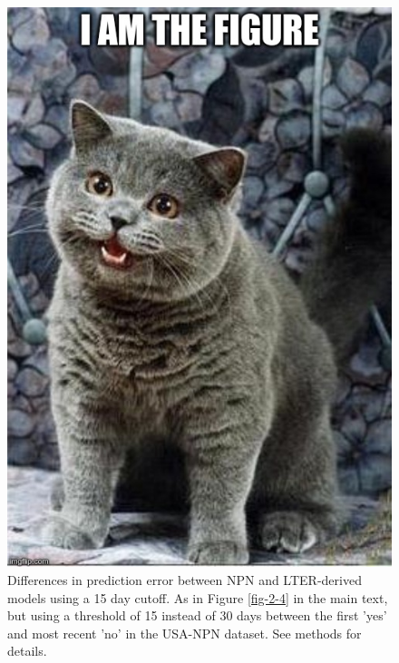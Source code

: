 \begin{figure}
	\centering
	\includegraphics[scale=0.5]{images/figure_filler.jpg}
	\caption[Differences in prediction error between NPN and LTER-derived models using a 15 day cutoff]{Differences in prediction error between NPN and LTER-derived models using a 15 day cutoff. As in Figure \ref{fig-2-4} in the main text, but using a threshold of 15 instead of 30 days between the first 'yes' and most recent 'no' in the USA-NPN dataset. See methods for details.} \label{fig-a-4}
\end{figure}

\newpage

